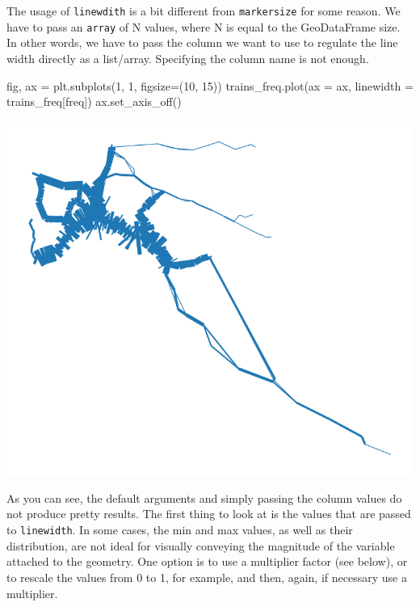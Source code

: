 \documentclass[
  letterpaper,
  DIV=11,
  numbers=noendperiod]{scrreprt}
\newenvironment{Shaded}{\begin{snugshade}}{\end{snugshade}}
\newcommand{\DecValTok}[1]{\textcolor[rgb]{0.68,0.00,0.00}{#1}}
\newcommand{\NormalTok}[1]{\textcolor[rgb]{0.00,0.23,0.31}{#1}}
\newcommand{\OperatorTok}[1]{\textcolor[rgb]{0.37,0.37,0.37}{#1}}
\newcommand{\StringTok}[1]{\textcolor[rgb]{0.13,0.47,0.30}{#1}}
\begin{document}
The usage of \texttt{linewdith} is a bit different from
\texttt{markersize} for some reason. We have to pass an \texttt{array}
of N values, where N is equal to the GeoDataFrame size. In other words,
we have to pass the column we want to use to regulate the line width
directly as a list/array. Specifying the column name is not enough.

\begin{Shaded}
\begin{Highlighting}[]
\NormalTok{fig, ax }\OperatorTok{=}\NormalTok{ plt.subplots(}\DecValTok{1}\NormalTok{, }\DecValTok{1}\NormalTok{, figsize}\OperatorTok{=}\NormalTok{(}\DecValTok{10}\NormalTok{, }\DecValTok{15}\NormalTok{))}
\NormalTok{trains\_freq.plot(ax }\OperatorTok{=}\NormalTok{ ax, linewidth }\OperatorTok{=}\NormalTok{ trains\_freq[}\StringTok{\textquotesingle{}freq\textquotesingle{}}\NormalTok{])}
\NormalTok{ax.set\_axis\_off()}
\end{Highlighting}
\end{Shaded}

\includegraphics{labs/w02_maps_files/figure-pdf/cell-55-output-1.png}

As you can see, the default arguments and simply passing the column
values do not produce pretty results. The first thing to look at is the
values that are passed to \texttt{linewidth}. In some cases, the min and
max values, as well as their distribution, are not ideal for visually
conveying the magnitude of the variable attached to the geometry. One
option is to use a multiplier factor (see below), or to rescale the
values from 0 to 1, for example, and then, again, if necessary use a
multiplier.
\end{document}
